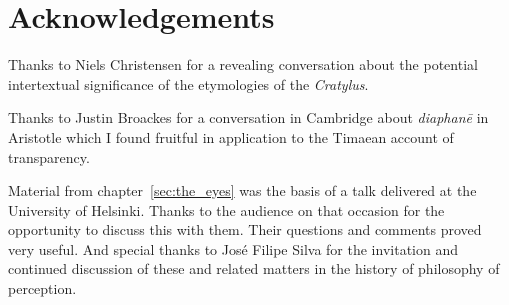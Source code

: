 \chapter*{Acknowledgements} %
\label{cha:acknowledgements}

Thanks to Niels Christensen for a revealing conversation about the potential intertextual significance of the etymologies of the \emph{Cratylus}.

Thanks to Justin Broackes for a conversation in Cambridge about \emph{diaphanē} in Aristotle which I found fruitful in application to the Timaean account of transparency.

Material from chapter~\ref{sec:the_eyes} was the basis of a talk delivered at the University of Helsinki. Thanks to the audience on that occasion for the opportunity to discuss this with them. Their questions and comments proved very useful. And special thanks to Jos\'{e} Filipe Silva for the invitation and continued discussion of these and related matters in the history of philosophy of perception.

